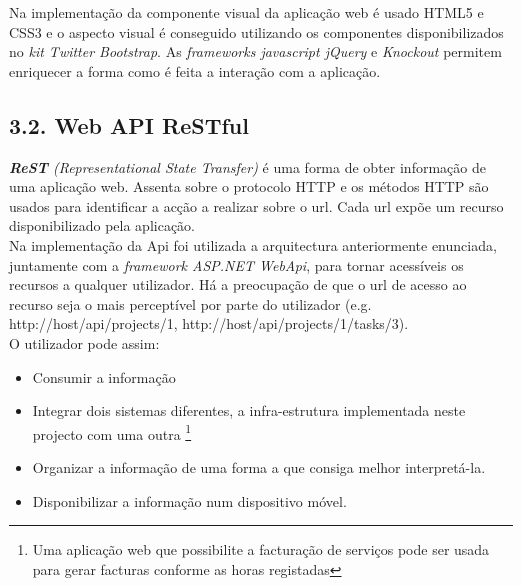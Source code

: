 \documentclass[]{article}
\begin{document}
Na implementação da componente visual da aplicação web é usado HTML5 e CSS3 e o aspecto visual é conseguido utilizando os componentes disponibilizados no \emph{kit Twitter Bootstrap}\cite{bootstrap}. As \emph{frameworks javascript jQuery}\cite{jquery} e \emph{Knockout}\cite{knockout} permitem enriquecer a forma como é feita a interação com a aplicação.

\subsection{3.2. Web API ReSTful}
\emph{\textbf{ReST} (Representational State Transfer)}\cite{rest} é uma forma de obter informação de uma aplicação web. Assenta sobre o protocolo HTTP e os métodos HTTP são usados para identificar a acção a realizar sobre o url. Cada url expõe um recurso disponibilizado pela aplicação.\\

Na implementação da Api foi utilizada a arquitectura anteriormente enunciada, juntamente com a \emph{framework ASP.NET WebApi}\cite{aspnetwebapi}, para tornar acessíveis os recursos a qualquer utilizador. Há a preocupação de que o url de acesso ao recurso seja o mais perceptível por parte do utilizador (e.g. http://host/api/projects/1, http://host/api/projects/1/tasks/3).\\

O utilizador pode assim:
\begin{itemize}
\item Consumir a informação
\item Integrar dois sistemas diferentes, a infra-estrutura implementada neste projecto com uma outra \footnote{Uma aplicação web que possibilite a facturação de serviços pode ser usada para gerar facturas conforme as horas registadas}
\item Organizar a informação de uma forma a que consiga melhor interpretá-la.
\item Disponibilizar a informação num dispositivo móvel.
\end{itemize}
\end{document}

